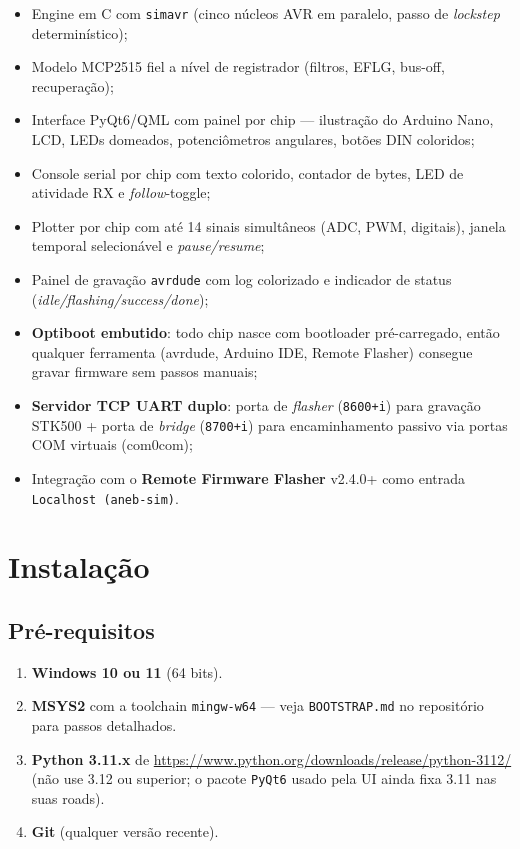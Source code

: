 \documentclass[12pt,a4paper]{article}
\begin{document}
\begin{itemize}[nosep]
  \item Engine em C com \texttt{simavr} (cinco núcleos AVR em paralelo,
        passo de \emph{lockstep} determinístico);
  \item Modelo MCP2515 fiel a nível de registrador (filtros, EFLG,
        bus-off, recuperação);
  \item Interface PyQt6/QML com painel por chip --- ilustração do
        Arduino Nano, LCD, LEDs domeados, potenciômetros angulares,
        botões DIN coloridos;
  \item Console serial por chip com texto colorido, contador de bytes,
        LED de atividade RX e \emph{follow}-toggle;
  \item Plotter por chip com até 14 sinais simultâneos (ADC, PWM,
        digitais), janela temporal selecionável e \emph{pause/resume};
  \item Painel de gravação \texttt{avrdude} com log colorizado e
        indicador de status (\emph{idle/flashing/success/done});
  \item \textbf{Optiboot embutido}: todo chip nasce com bootloader
        pré-carregado, então qualquer ferramenta (avrdude,
        Arduino IDE, Remote Flasher) consegue gravar firmware sem
        passos manuais;
  \item \textbf{Servidor TCP UART duplo}: porta de \emph{flasher}
        (\texttt{8600+i}) para gravação STK500 + porta de
        \emph{bridge} (\texttt{8700+i}) para encaminhamento passivo
        via portas COM virtuais (com0com);
  \item Integração com o \textbf{Remote Firmware Flasher} v2.4.0+
        como entrada \texttt{Localhost (aneb-sim)}.
\end{itemize}

\section{Instalação}

\subsection{Pré-requisitos}

\begin{enumerate}[nosep]
  \item \textbf{Windows 10 ou 11} (64 bits).
  \item \textbf{MSYS2} com a toolchain \texttt{mingw-w64} --- veja
        \texttt{BOOTSTRAP.md} no repositório para passos detalhados.
  \item \textbf{Python 3.11.x} de
        \url{https://www.python.org/downloads/release/python-3112/}
        (não use 3.12 ou superior; o pacote \texttt{PyQt6} usado
        pela UI ainda fixa 3.11 nas suas roads).
  \item \textbf{Git} (qualquer versão recente).
\end{enumerate}
\end{document}
